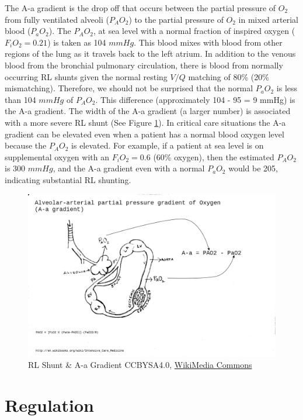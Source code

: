 The A-a gradient is the drop off that occurs between the partial pressure of $O_2$ from fully ventilated alveoli ($P_AO_2$) to the partial pressure of $O_2$ in mixed arterial blood ($P_aO_2$). The $P_AO_2$, at sea level with a normal fraction of inspired oxygen ($F_iO_2 = 0.21$) is taken as 104 $mmHg$. This blood mixes with blood from other regions of the lung as it travels back to the left atrium. In addition to the venous blood from the bronchial pulmonary circulation, there is blood from normally occurring RL shunts given the normal resting $V/Q$ matching of 80\% (20\% mismatching). Therefore, we should not be surprised that the normal $P_aO_2$ is less than 104 $mmHg$ of $P_AO_2$. This difference (approximately 104 - 95 = 9 mmHg) is the A-a gradient. The width of the A-a gradient (a larger number) is associated with a more severe RL shunt (See Figure \ref{fig:aagradient}). In critical care situations the A-a gradient can be elevated even when a patient has a normal blood oxygen level because the $P_AO_2$ is elevated. 
For example, if a patient at sea level is on supplemental oxygen with an $F_iO_2 = 0.6$ (60\% oxygen), then the estimated $P_AO_2$ is 300 $mmHg$, and the A-a gradient even with a normal $P_aO_2$ would be 205, indicating substantial RL shunting.

\begin{figure}[!h]
    \centering
    \includegraphics[width=1.0 \linewidth]{./figure/ventilation/aagradient.jpg}
    \caption{RL Shunt \& A-a Gradient \footnotesize{CCBYSA4.0, \href{https://commons.wikimedia.org/wiki/File:Intensivecaremedicine_aagradient.jpg}{WikiMedia Commons}}}
    \label{fig:aagradient}
\end{figure}


\section{Regulation}

